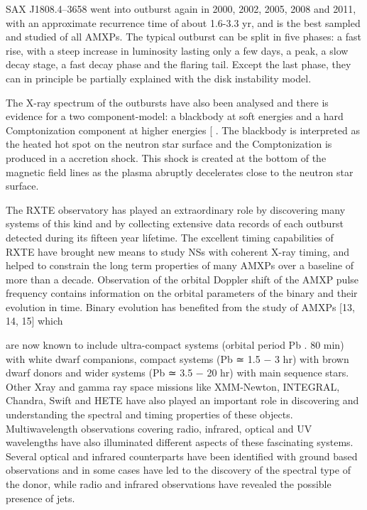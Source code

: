 \documentclass{wihuri}
\begin{document}
SAX J1808.4–3658 went into outburst again in 2000, 2002, 2005, 2008 and 2011,
with an approximate recurrence time of about 1.6-3.3 yr, and is the best sampled and
studied of all AMXPs. The typical outburst can be split in five phases: a
fast rise, with a steep increase in luminosity lasting only a few days, a peak, a slow
decay stage, a fast decay phase and the flaring tail. Except the last phase, they can in principle be partially explained with the disk instability model. %


The X-ray spectrum of the outbursts have also been analysed and there is evidence for a two component-model: a blackbody at soft energies and a hard Comptonization component at higher energies [%
. The blackbody is interpreted as the heated hot spot on the neutron star surface and the Comptonization is produced in a accretion shock. This shock is created at the bottom of the magnetic field lines as the plasma abruptly decelerates close to the neutron star surface.




\iffalse

The RXTE observatory has played an extraordinary role by discovering many
systems of this kind and by collecting extensive data records of each outburst detected
during its fifteen year lifetime. The excellent timing capabilities of RXTE
have brought new means to study NSs with coherent X-ray timing, and helped to
constrain the long term properties of many AMXPs over a baseline of more than
a decade. Observation of the orbital Doppler shift of the AMXP pulse frequency
contains information on the orbital parameters of the binary and their evolution in
time. Binary evolution has benefited from the study of AMXPs [13, 14, 15] which

are now known to include ultra-compact systems (orbital period Pb . 80 min) with
white dwarf companions, compact systems (Pb ≃ 1.5 − 3 hr) with brown dwarf
donors and wider systems (Pb ≃ 3.5 − 20 hr) with main sequence stars. Other Xray
and gamma ray space missions like XMM-Newton, INTEGRAL, Chandra, Swift
and HETE have also played an important role in discovering and understanding the
spectral and timing properties of these objects. Multiwavelength observations covering
radio, infrared, optical and UV wavelengths have also illuminated different
aspects of these fascinating systems. Several optical and infrared counterparts have
been identified with ground based observations and in some cases have led to the
discovery of the spectral type of the donor, while radio and infrared observations
have revealed the possible presence of jets.
\end{document}
